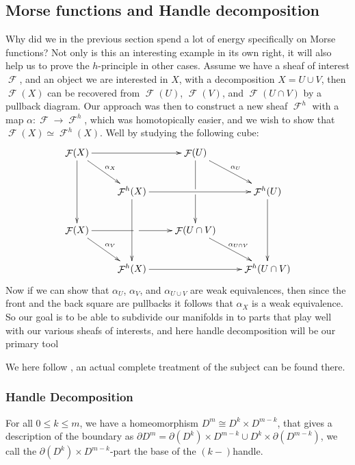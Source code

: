 \documentclass{article}
\newtheorem{proposed work}[theorem]{Proposed Work}
\DeclareMathOperator{\CF}{\mathcal F}
\newcommand{\xymat}[1]{\begin{align*}\xymatrix{ #1}\end{align*}}
\begin{document}
\subsection{Morse functions and Handle decomposition}
Why did we in the previous section spend a lot of energy specifically on Morse functions? Not only is this an interesting example in its own right, it will also help us to prove the $h$-principle in other cases. Assume we have a sheaf of interest $\CF$, and an object we are interested in $X$, with a decomposition $X=U\cup V$, then $\CF (X)$ can be recovered from $\CF (U)$, $\CF (V)$, and $\CF (U\cap V)$ by a pullback diagram. Our approach was then to construct a new sheaf $\CF^h$ with a map $\alpha: \CF\to \CF^h$, which was homotopically easier, and we wish to show that $\CF(X)\simeq \CF^h(X)$. Well by studying the following cube:
\xymat{\CF(X) \ar[rr] \ar[dd] \ar[dr]^{\alpha_X} && \CF(U) \ar[dd]|\hole \ar[dr]^{\alpha_U} & \\
&\CF^h(X) \ar[rr] \ar[dd] && \CF^h(U) \ar[dd] \\
\CF(X) \ar[rr]|\hole \ar[dr]^{\alpha_V} && \CF(U\cap V)  \ar[dr]^{\alpha_{U\cap V}} & \\
&\CF^h(X) \ar[rr] && \CF^h(U\cap V)   }
Now if we can show that $\alpha_U$, $\alpha_{V}$, and $\alpha_{U\cup V}$ are weak equivalences, then since the front and the back square are pullbacks it follows that $\alpha_X$ is a weak equivalence. So our goal is to be able to subdivide our manifolds in to parts that play well with our various sheafs of interests, and here handle decomposition will be our primary tool

We here follow \cite{milnor2016morse}, an actual complete treatment of the subject can be found there.
\subsubsection{Handle Decomposition}
For all $0\leq k \leq m$, we have a homeomorphism $D^m\cong D^k\times D^{m-k}$, that gives a description of the boundary as $\partial D^m = \partial(D^k) \times D^{m-k} \cup D^k\times \partial(D^{m-k})$, we call the $\partial(D^k) \times D^{m-k}$-part the base of the $(k-)$handle. 
\end{document}
